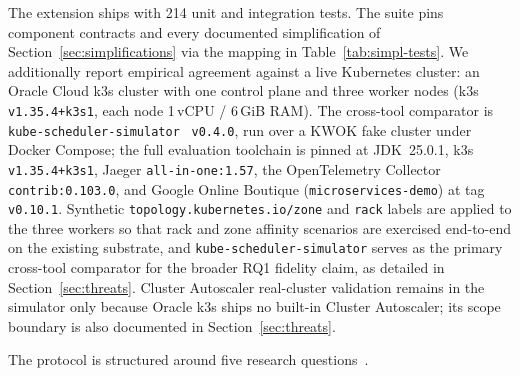 \documentclass[ASNA,twocolumn]{USG}
\begin{document}
    The extension ships with 214 unit and integration tests. The suite pins component
    contracts and every documented simplification of
    Section~\ref{sec:simplifications} via the mapping in
    Table~\ref{tab:simpl-tests}. We additionally report empirical
    agreement against a live Kubernetes cluster: an Oracle Cloud k3s
    cluster with one control plane and three worker nodes
    (k3s \texttt{v1.35.4+k3s1}, each node 1\,vCPU / 6\,GiB RAM).
    The cross-tool comparator is
    \texttt{kube-scheduler-simulator}~\cite{KubeSchSim2025}
    \texttt{v0.4.0}, run over a KWOK fake cluster under Docker Compose;
    the full evaluation toolchain is pinned at JDK~25.0.1, k3s
    \texttt{v1.35.4+k3s1}, Jaeger \texttt{all-in-one:1.57}, the
    OpenTelemetry Collector \texttt{contrib:0.103.0}, and Google Online
    Boutique (\texttt{microservices-demo}) at tag \texttt{v0.10.1}.
    Synthetic \texttt{topology.kubernetes.io/zone} and \texttt{rack}
    labels are applied to the three workers so that
    rack and zone affinity scenarios are exercised end-to-end on
    the existing substrate, and \texttt{kube-scheduler-simulator}
    serves as the primary cross-tool comparator for the broader
    RQ1 fidelity claim, as detailed in Section~\ref{sec:threats}.
    Cluster Autoscaler real-cluster validation remains in the simulator
    only because Oracle k3s ships no built-in Cluster Autoscaler; its
    scope boundary is also documented in Section~\ref{sec:threats}.

    The protocol is structured around five research
    questions~\cite{Pucher2015}.
\end{document}
